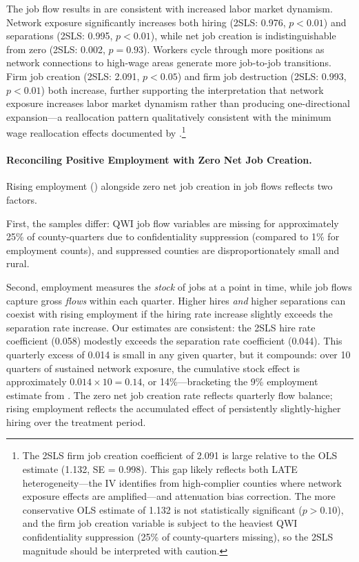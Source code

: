 \documentclass[12pt]{article}
\begin{document}
The job flow results in  are consistent with increased labor market dynamism. Network exposure significantly increases both hiring (2SLS: 0.976, $p < 0.01$) and separations (2SLS: 0.995, $p < 0.01$), while net job creation is indistinguishable from zero (2SLS: 0.002, $p = 0.93$). Workers cycle through more positions as network connections to high-wage areas generate more job-to-job transitions. Firm job creation (2SLS: 2.091, $p < 0.05$) and firm job destruction (2SLS: 0.993, $p < 0.01$) both increase, further supporting the interpretation that network exposure increases labor market dynamism rather than producing one-directional expansion---a reallocation pattern qualitatively consistent with the minimum wage reallocation effects documented by \citet{dustmann2022}.\footnote{The 2SLS firm job creation coefficient of 2.091 is large relative to the OLS estimate (1.132, SE = 0.998). This gap likely reflects both LATE heterogeneity---the IV identifies from high-complier counties where network exposure effects are amplified---and attenuation bias correction. The more conservative OLS estimate of 1.132 is not statistically significant ($p > 0.10$), and the firm job creation variable is subject to the heaviest QWI confidentiality suppression (25\% of county-quarters missing), so the 2SLS magnitude should be interpreted with caution.}

\paragraph{Reconciling Positive Employment with Zero Net Job Creation.} Rising employment () alongside zero net job creation in job flows reflects two factors.

First, the samples differ: QWI job flow variables are missing for approximately 25\% of county-quarters due to confidentiality suppression (compared to 1\% for employment counts), and suppressed counties are disproportionately small and rural.

Second, employment measures the \textit{stock} of jobs at a point in time, while job flows capture gross \textit{flows} within each quarter. Higher hires \textit{and} higher separations can coexist with rising employment if the hiring rate increase slightly exceeds the separation rate increase. Our estimates are consistent: the 2SLS hire rate coefficient (0.058) modestly exceeds the separation rate coefficient (0.044). This quarterly excess of 0.014 is small in any given quarter, but it compounds: over 10 quarters of sustained network exposure, the cumulative stock effect is approximately $0.014 \times 10 = 0.14$, or 14\%---bracketing the 9\% employment estimate from . The zero net job creation rate reflects quarterly flow balance; rising employment reflects the accumulated effect of persistently slightly-higher hiring over the treatment period.
\end{document}
